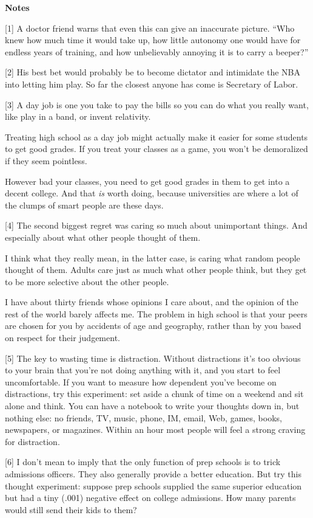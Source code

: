 \textbf{Notes}

{[}1{]} A doctor friend warns that even this can give an inaccurate
picture. ``Who knew how much time it would take up, how little autonomy
one would have for endless years of training, and how unbelievably
annoying it is to carry a beeper?''

{[}2{]} His best bet would probably be to become dictator and intimidate
the NBA into letting him play. So far the closest anyone has come is
Secretary of Labor.

{[}3{]} A day job is one you take to pay the bills so you can do what
you really want, like play in a band, or invent relativity.

Treating high school as a day job might actually make it easier for some
students to get good grades. If you treat your classes as a game, you
won't be demoralized if they seem pointless.

However bad your classes, you need to get good grades in them to get
into a decent college. And that \emph{is} worth doing, because
universities are where a lot of the clumps of smart people are these
days.

{[}4{]} The second biggest regret was caring so much about unimportant
things. And especially about what other people thought of them.

I think what they really mean, in the latter case, is caring what random
people thought of them. Adults care just as much what other people
think, but they get to be more selective about the other people.

I have about thirty friends whose opinions I care about, and the opinion
of the rest of the world barely affects me. The problem in high school
is that your peers are chosen for you by accidents of age and geography,
rather than by you based on respect for their judgement.

{[}5{]} The key to wasting time is distraction. Without distractions
it's too obvious to your brain that you're not doing anything with it,
and you start to feel uncomfortable. If you want to measure how
dependent you've become on distractions, try this experiment: set aside
a chunk of time on a weekend and sit alone and think. You can have a
notebook to write your thoughts down in, but nothing else: no friends,
TV, music, phone, IM, email, Web, games, books, newspapers, or
magazines. Within an hour most people will feel a strong craving for
distraction.

{[}6{]} I don't mean to imply that the only function of prep schools is
to trick admissions officers. They also generally provide a better
education. But try this thought experiment: suppose prep schools
supplied the same superior education but had a tiny (.001) negative
effect on college admissions. How many parents would still send their
kids to them?

